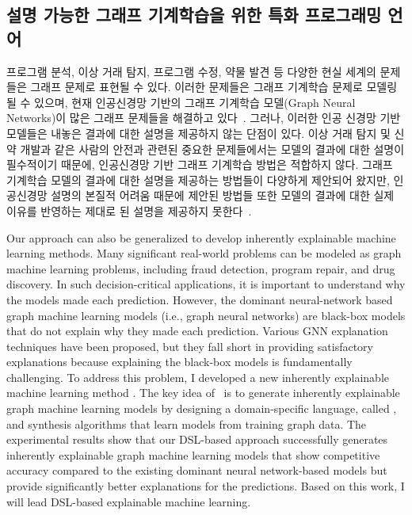 \documentclass[11pt]{article}
\begin{document}
\begin{spacing}{1.145}
\section{설명 가능한 그래프 기계학습을 위한 특화 프로그래밍 언어}
%
프로그램 분석, 이상 거래 탐지, 프로그램 수정, 약물 발견 등 다양한 현실 세계의 문제들은 그래프 문제로 표현될 수 있다.
%
이러한 문제들은 그래프 기계학습 문제로 모델링될 수 있으며, 현재 인공신경망 기반의 그래프 기계학습 모델(Graph Neural Networks)이 많은 그래프 문제들을 해결하고 있다~\cite{wu2019comprehensive}.
%
그러나, 이러한 인공 신경망 기반 모델들은 내놓은 결과에 대한 설명을 제공하지 않는 단점이 있다.
%
이상 거래 탐지 및 신약 개발과 같은 사람의 안전과 관련된 중요한 문제들에서는 모델의 결과에 대한 설명이 필수적이기 때문에, 인공신경망 기반 그래프 기계학습 방법은 적합하지 않다.
%
그래프 기계학습 모델의 결과에 대한 설명을 제공하는 방법들이 다양하게 제안되어 왔지만, 인공신경망 설명의 본질적 어려움 때문에 제안된 방법들 또한 모델의 결과에 대한 실제 이유를 반영하는 제대로 된 설명을 제공하지 못한다~\cite{yuan20survey}.







\clearpage
Our approach can also be generalized to develop inherently explainable machine learning methods. 
%
Many significant real-world problems can be modeled as graph machine learning problems, including fraud detection, program repair, and drug discovery.
%
In such decision-critical applications, it is important to understand why the models made each prediction.
%
However, the dominant neural-network based graph machine learning models (i.e., graph neural networks) are black-box models that do not explain why they made each prediction.
%
Various GNN explanation techniques have been proposed, but they fall short in providing satisfactory explanations because explaining the black-box models is fundamentally challenging.
%
To address this problem, I developed a new inherently explainable machine learning method {\PLXGL}.
%
The key idea of \PLXGL~is to generate inherently explainable graph machine learning models by designing a domain-specific language, called \GDL, and synthesis algorithms that learn models from training graph data.
%
The experimental results show that our DSL-based approach successfully generates inherently explainable graph machine learning models that show competitive accuracy compared to the existing dominant neural network-based models but provide significantly better explanations for the predictions.
%
Based on this work, I will lead DSL-based explainable machine learning.




\end{spacing}
\end{document}
